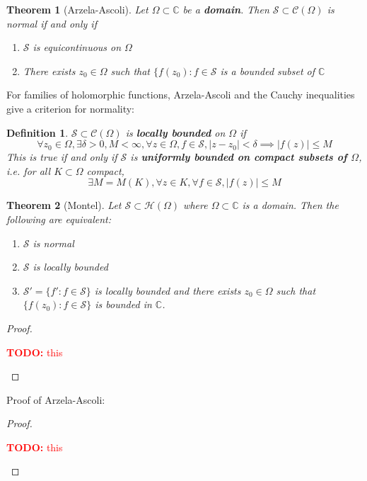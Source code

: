 \documentclass{article}
\newtheorem{theorem}{Theorem}
\newcommand{\mbb}[1]{\mathbb{#1}}
\newcommand{\mc}[1]{\mathcal{#1}}
\newtheorem{definition}{Definition}
\newcommand{\TODO}[1]{\begin{center}\huge{\textcolor{red}{\textbf{TODO:} #1}}\end{center}}
\begin{document}
\begin{theorem}[Arzela-Ascoli]
Let \(\Omega \subset \mbb{C}\) be a \textbf{domain}. Then \(\mc{S} \subset \mc{C}(\Omega)\) is normal if and only if
\begin{enumerate}

  \item \(\mc{S}\) is equicontinuous on \(\Omega\)

  \item There exists \(z_0 \in \Omega\) such that \(\{f(z_0) : f \in \mc{S}\) is a bounded subset of \(\mbb{C}\)

\end{enumerate}
\end{theorem}
For families of holomorphic functions, Arzela-Ascoli and the Cauchy inequalities give a criterion for normality:
\begin{definition}
\(\mc{S} \subset \mc{C}(\Omega)\) is \textbf{locally bounded} on \(\Omega\) if
\[\forall z_0 \in \Omega, \exists \delta > 0, M < \infty, \forall z \in \Omega, f \in \mc{S}, |z - z_0| < \delta \implies |f(z)| \leq M\]
This is true if and only if \(\mc{S}\) is \textbf{uniformly bounded on compact subsets of \(\Omega\)}, i.e. for all \(K \subset \Omega\) compact,
\[\exists M = M(K), \forall z \in K, \forall f \in \mc{S}, |f(z)| \leq M\]
\end{definition}
\begin{theorem}[Montel]
Let \(\mc{S} \subset \mc{H}(\Omega)\) where \(\Omega \subset \mbb{C}\) is a domain. Then the following are equivalent:
\begin{enumerate}

  \item \(\mc{S}\) is normal

  \item \(\mc{S}\) is locally bounded

  \item \(\mc{S}' = \{f' : f \in \mc{S}\}\) is locally bounded and there exists \(z_0 \in\Omega\) such that \(\{f(z_0) : f \in \mc{S}\}\) is bounded in \(\mbb{C}\).

\end{enumerate}
\end{theorem}
\begin{proof}

\TODO{this}

\end{proof}
Proof of Arzela-Ascoli:
\begin{proof}

\TODO{this}

\end{proof}
\end{document}
